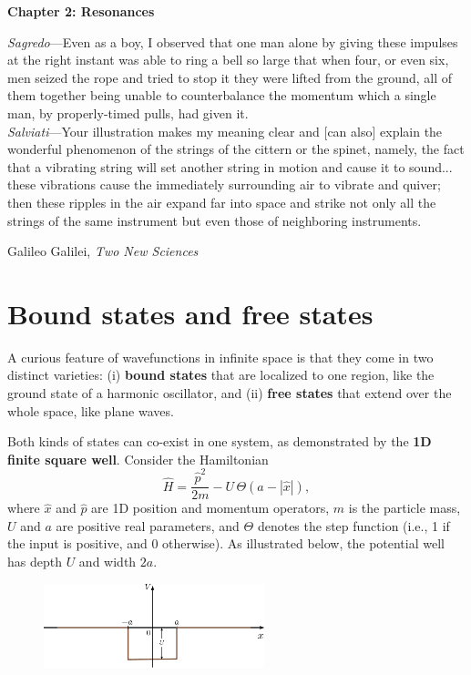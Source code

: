 \documentclass[pra,12pt]{revtex4}
\begin{document}
\setcounter{page}{20}

\setlength{\epigraphwidth}{0.7\textwidth}

\begin{center}
{\Large \textbf{Chapter 2: Resonances}}
\end{center}

\epigraph{
\textit{Sagredo}---Even as a boy, I observed that one man alone by giving these impulses at the right instant was able to ring a bell so large that when four, or even six, men seized the rope and tried to stop it they were lifted from the ground, all of them together being unable to counterbalance the momentum which a single man, by properly-timed pulls, had given it. \\ \vskip0.1in
\textit{Salviati}---Your illustration makes my meaning clear and [can also] explain the wonderful phenomenon of the strings of the cittern or the spinet, namely, the fact that a vibrating string will set another string in motion and cause it to sound... these vibrations cause the immediately surrounding air to vibrate and quiver; then these ripples in the air expand far into space and strike not only all the strings of the same instrument but even those of neighboring instruments.}{Galileo Galilei, \textit{Two New Sciences}}

\section{Bound states and free states}

A curious feature of wavefunctions in infinite space is that they come
in two distinct varieties: (i) \textbf{bound states} that are
localized to one region, like the ground state of a harmonic
oscillator, and (ii) \textbf{free states} that extend over the whole
space, like plane waves.

Both kinds of states can co-exist in one system, as demonstrated by
the \textbf{1D finite square well}.  Consider the Hamiltonian
\begin{equation}
  \hat{H} = \frac{\hat{p}^2}{2m} - U \,\Theta(a -|\hat{x}|),
\end{equation}
where $\hat{x}$ and $\hat{p}$ are 1D position and momentum operators,
$m$ is the particle mass, $U$ and $a$ are positive real parameters,
and $\Theta$ denotes the step function (i.e., 1 if the input is
positive, and 0 otherwise).  As illustrated below, the potential well
has depth $U$ and width $2a$.

\begin{figure}[h]
  \centering\includegraphics[width=0.57\textwidth]{squarewell}
\end{figure}
\end{document}
